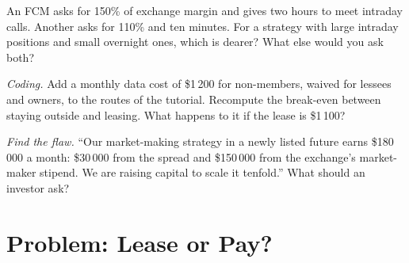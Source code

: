 \begin{exercise}[$\star\star$]\label{exo:m1:getting-access-futures-options:6}
An FCM asks for 150\% of exchange margin and gives two hours to meet intraday
calls. Another asks for 110\% and ten minutes. For a strategy with large
intraday positions and small overnight ones, which is dearer? What else
would you ask both?
\end{exercise}

\begin{exercise}[$\star\star\star$]\label{exo:m1:getting-access-futures-options:7}
\emph{Coding.} Add a monthly data cost of \$1\,200 for non-members, waived for
lessees and owners, to the routes of the tutorial. Recompute the break-even
between staying outside and leasing. What happens to it if the lease is
\$1\,100?
\end{exercise}

\begin{exercise}[$\star\star\star$]\label{exo:m1:getting-access-futures-options:8}
\emph{Find the flaw.} ``Our market-making strategy in a newly listed future
earns \$180\,000 a month: \$30\,000 from the spread and \$150\,000 from the
exchange's market-maker stipend. We are raising capital to scale it
tenfold.'' What should an investor ask?
\end{exercise}

\section{Problem: Lease or Pay?}

